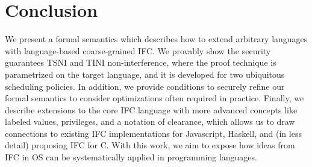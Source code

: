 \section{Conclusion}
\label{sec:conclusion}

We present a formal semantics which describes how to extend arbitrary languages
with language-based coarse-grained IFC. We provably show the security guarantees
TSNI and TINI non-interference, where the proof technique is parametrized on the
target language, and it is developed for two ubiquitous scheduling policies. In
addition, we provide conditions to securely refine our formal semantics to
consider optimizations often required in practice. Finally, we describe
extensions to the core IFC language with more advanced concepts like labeled
values, privileges, and a notation of clearance, which allows us to draw
connections to existing IFC implementations for Javascript, Haskell, and (in
less detail) proposing IFC for C. With this work, we aim to expose how ideas
from IFC in OS can be systematically applied in programming languages.


